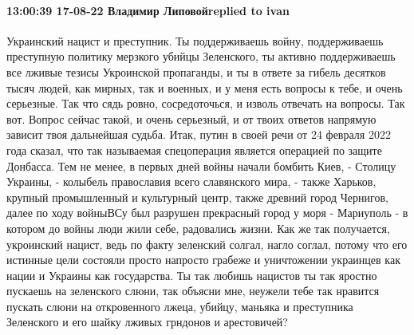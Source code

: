  
 
 
 
 

\paragraph{13:00:39 17-08-22 Владимир Липовойreplied to ivan}

Украинский нацист и преступник. Ты поддерживаешь войну, поддерживаешь преступную
политику мерзкого убийцы Зеленского, ты активно поддерживаешь все лживые тезисы
Укроинской пропаганды, и ты в ответе за гибель десятков тысяч людей, как мирных, так и
военных, и у меня есть вопросы к тебе, и очень серьезные. Так что сядь ровно,
сосредоточься, и изволь отвечать на вопросы. Так вот. Вопрос сейчас такой, и
очень серьезный, и от твоих ответов напрямую зависит твоя дальнейшая судьба.
Итак, путин в своей речи от 24 февраля 2022 года сказал, что так называемая
спецоперация является операцией по защите Донбасса. Тем не менее, в первых дней
войны начали бомбить Киев, - Столицу Украины, - колыбель православия всего
славянского мира, - также Харьков, крупный промышленный и культурный центр,
также древний город Чернигов, далее по ходу войныВСу был разрушен прекрасный
город у моря - Мариуполь - в котором до войны люди жили себе, радовались
жизни. Как же так получается, укроинский нацист, ведь по факту зеленский солгал,
нагло соглал, потому что его истинные цели состояли просто напросто грабеже и
уничтожении украинцев как нации и Украины как государства. Ты так любишь нацистов
ты так яростно пускаешь на зеленского слюни, так объясни мне, неужели тебе так
нравится пускать слюни на откровенного лжеца, убийцу, маньяка и преступника
Зеленского и его шайку лживых грндонов и арестовичей?
